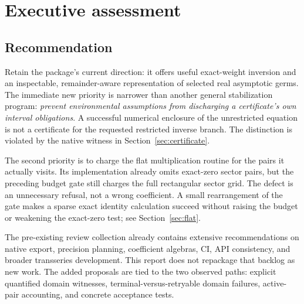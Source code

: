 \documentclass[11pt,a4paper]{article}
\begin{document}
\section{Executive assessment}
\subsection{Recommendation}
Retain the package's current direction: it offers useful exact-weight inversion and an inspectable, remainder-aware representation of selected real asymptotic germs. The immediate new priority is narrower than another general stabilization program: \emph{prevent environmental assumptions from discharging a certificate's own interval obligations}. A successful numerical enclosure of the unrestricted equation is not a certificate for the requested restricted inverse branch. The distinction is violated by the native witness in Section~\ref{sec:certificate}.

The second priority is to charge the flat multiplication routine for the pairs it actually visits. Its implementation already omits exact-zero sector pairs, but the preceding budget gate still charges the full rectangular sector grid. The defect is an unnecessary refusal, not a wrong coefficient. A small rearrangement of the gate makes a sparse exact identity calculation succeed without raising the budget or weakening the exact-zero test; see Section~\ref{sec:flat}.

The pre-existing review collection already contains extensive recommendations on native export, precision planning, coefficient algebras, CI, API consistency, and broader transseries development. This report does not repackage that backlog as new work. The added proposals are tied to the two observed paths: explicit quantified domain witnesses, terminal-versus-retryable domain failures, active-pair accounting, and concrete acceptance tests.\cite{review-index,review-status}
\end{document}
